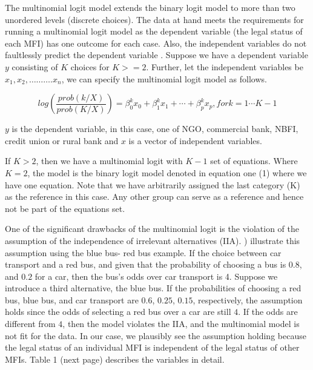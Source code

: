 \documentclass[a4paper,nobind]{templates/ociamthesis}
\begin{document}
The multinomial logit model extends the binary logit model to more than two unordered levels (discrete choices). The data at hand meets the requirements for running a multinomial logit model as the dependent variable (the legal status of each MFI) has one outcome for each case. Also, the independent variables do not faultlessly predict the dependent variable \autocite{petrucci2009primer}. Suppose we have a dependent variable \(y\) consisting of \(K\) choices for \(K>=2\). Further, let the independent variables be \(x_1, x_2,………. x_n\), we can specify the multinomial logit model as follows.

\begin{equation}
log(\frac{prob(k/X)}{prob(K/X)}) =   \beta_{0}^{k}  x_{0}  + \beta_{1}^{k}  x_{1} +  \cdots + \beta_{p}^{k}  x_{p}, for k = 1 \cdots K-1
\end{equation}

\(y\) is the dependent variable, in this case, one of NGO, commercial bank, NBFI, credit union or rural bank and \(x\) is a vector of independent variables.

If \(K>2\), then we have a multinomial logit with \(K-1\) set of equations. Where \(K=2\), the model is the binary logit model denoted in equation one (1) where we have one equation. Note that we have arbitrarily assigned the last category (K) as the reference in this case. Any other group can serve as a reference and hence not be part of the equations set.

One of the significant drawbacks of the multinomial logit is the violation of the assumption of the independence of irrelevant alternatives (IIA). \textcite{cheng2007testing} ) illustrate this assumption using the blue bus- red bus example. If the choice between car transport and a red bus, and given that the probability of choosing a bus is \(0.8\), and \(0.2\) for a car, then the bus's odds over car transport is 4. Suppose we introduce a third alternative, the blue bus. If the probabilities of choosing a red bus, blue bus, and car transport are \(0.6\), \(0.25\), \(0.15\), respectively, the assumption holds since the odds of selecting a red bus over a car are still \(4\). If the odds are different from \(4\), then the model violates the IIA, and the multinomial model is not fit for the data. In our case, we plausibly see the assumption holding because the legal status of an individual MFI is independent of the legal status of other MFIs. Table 1 (next page) describes the variables in detail.
\end{document}
